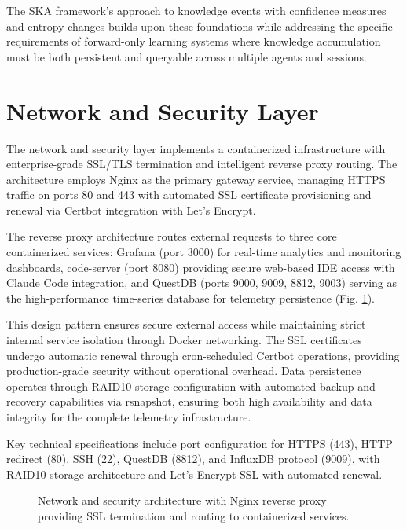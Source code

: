 \documentclass[11pt]{article}
\begin{document}
	The SKA framework's approach to knowledge events with confidence measures and entropy changes builds upon these foundations while addressing the specific requirements of forward-only learning systems where knowledge accumulation must be both persistent and queryable across multiple agents and sessions.
	
	\section{Network and Security Layer}
	\label{sec:network-security}
	
	The network and security layer implements a containerized infrastructure with enterprise-grade SSL/TLS termination and intelligent reverse proxy routing. The architecture employs Nginx as the primary gateway service, managing HTTPS traffic on ports 80 and 443 with automated SSL certificate provisioning and renewal via Certbot integration with Let's Encrypt.
	
	The reverse proxy architecture routes external requests to three core containerized services: Grafana (port 3000) for real-time analytics and monitoring dashboards, code-server (port 8080) providing secure web-based IDE access with Claude Code integration, and QuestDB (ports 9000, 9009, 8812, 9003) serving as the high-performance time-series database for telemetry persistence (Fig. \ref{fig:network-security}).
	
	This design pattern ensures secure external access while maintaining strict internal service isolation through Docker networking. The SSL certificates undergo automatic renewal through cron-scheduled Certbot operations, providing production-grade security without operational overhead. Data persistence operates through RAID10 storage configuration with automated backup and recovery capabilities via rsnapshot, ensuring both high availability and data integrity for the complete telemetry infrastructure.
	
	Key technical specifications include port configuration for HTTPS (443), HTTP redirect (80), SSH (22), QuestDB (8812), and InfluxDB protocol (9009), with RAID10 storage architecture and Let's Encrypt SSL with automated renewal.
	
	\begin{figure}[H]
		\centering
		\scalebox{0.75}{}
		\caption{Network and security architecture with Nginx reverse proxy providing SSL termination and routing to containerized services.}
		\label{fig:network-security}
	\end{figure}
	
\end{document}

